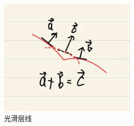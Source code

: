 \documentclass[a4paper,twoside]{ctexart}
\begin{document}
\begin{itemize}
\begin{itemize}
    \begin{figure}[htbp]
      \centering
      \includegraphics[width=0.6\textwidth]{pic/光滑层线.jpg}
      \caption{光滑层线}
      \label{fig:光滑层线}
    \end{figure}
  \end{itemize}
\end{itemize}

\end{document}
